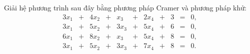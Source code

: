 \documentclass[class=nhvh-linear-algebra,crop=false]{standalone}
\begin{document}
\begin{exercise}
    \par Giải hệ phương trình sau đây bằng phương pháp Cramer và phương pháp khử:
    \[
        \begin{array}{ccccccccccc}
            3x_{1} & + & 4x_{2} & + & x_{3}  & + & 2x_{4} & + & 3 & = & 0, \\
            3x_{1} & + & 5x_{2} & + & 3x_{3} & + & 5x_{4} & + & 6 & = & 0, \\
            6x_{1} & + & 8x_{2} & + & x_{3}  & + & 5x_{4} & + & 8 & = & 0, \\
            3x_{1} & + & 5x_{2} & + & 3x_{3} & + & 7x_{4} & + & 8 & = & 0.
        \end{array}
    \]
\end{exercise}
\end{document}
